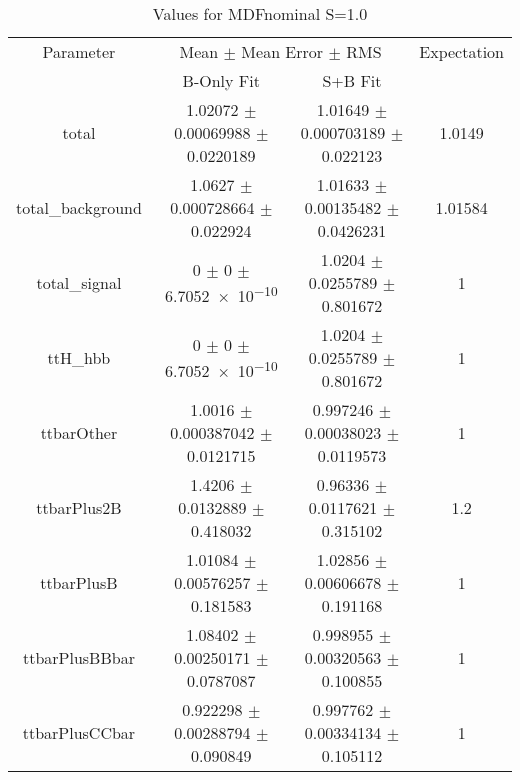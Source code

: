 \begin{table}
\centering
\caption{Values for MDFnominal S=1.0}
\begin{tabular}{cccc}
\toprule
Parameter & \multicolumn{2}{c}{Mean $\pm$ Mean Error $\pm$ RMS} & Expectation\\
 & B-Only Fit & S+B Fit & \\
\midrule
total & \num{1.02072} $\pm$ \num{0.00069988} $\pm$ \num{0.0220189} & \num{1.01649} $\pm$ \num{0.000703189} $\pm$ \num{0.022123} & \num{1.0149}\\
total\_background & \num{1.0627} $\pm$ \num{0.000728664} $\pm$ \num{0.022924} & \num{1.01633} $\pm$ \num{0.00135482} $\pm$ \num{0.0426231} & \num{1.01584}\\
total\_signal & \num{0} $\pm$ \num{0} $\pm$ \num{6.7052e-10} & \num{1.0204} $\pm$ \num{0.0255789} $\pm$ \num{0.801672} & \num{1}\\
ttH\_hbb & \num{0} $\pm$ \num{0} $\pm$ \num{6.7052e-10} & \num{1.0204} $\pm$ \num{0.0255789} $\pm$ \num{0.801672} & \num{1}\\
ttbarOther & \num{1.0016} $\pm$ \num{0.000387042} $\pm$ \num{0.0121715} & \num{0.997246} $\pm$ \num{0.00038023} $\pm$ \num{0.0119573} & \num{1}\\
ttbarPlus2B & \num{1.4206} $\pm$ \num{0.0132889} $\pm$ \num{0.418032} & \num{0.96336} $\pm$ \num{0.0117621} $\pm$ \num{0.315102} & \num{1.2}\\
ttbarPlusB & \num{1.01084} $\pm$ \num{0.00576257} $\pm$ \num{0.181583} & \num{1.02856} $\pm$ \num{0.00606678} $\pm$ \num{0.191168} & \num{1}\\
ttbarPlusBBbar & \num{1.08402} $\pm$ \num{0.00250171} $\pm$ \num{0.0787087} & \num{0.998955} $\pm$ \num{0.00320563} $\pm$ \num{0.100855} & \num{1}\\
ttbarPlusCCbar & \num{0.922298} $\pm$ \num{0.00288794} $\pm$ \num{0.090849} & \num{0.997762} $\pm$ \num{0.00334134} $\pm$ \num{0.105112} & \num{1}\\
\bottomrule
\end{tabular}
\end{table}